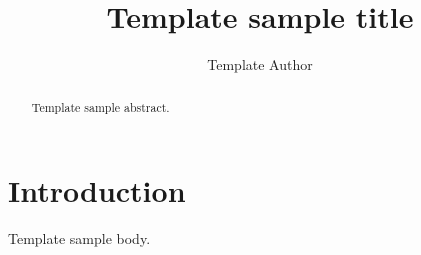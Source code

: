 \documentclass[a4paper,fleqn]{cas-sc}
\begin{document}
\title{Template sample title}
\author[a]{Template Author}
\begin{abstract}
Template sample abstract.
\end{abstract}
\maketitle
\section{Introduction}
Template sample body.

\end{document}
